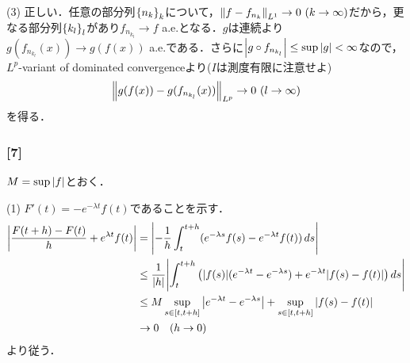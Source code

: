 \documentclass[a4j]{ltjsarticle}
\newcommand{\1}{\mathbbm{1}}
\numberwithin{equation}{section}
\theoremstyle{definition}
\begin{document}
(3) 正しい．任意の部分列$\qty{n_k}_k$について，$\norm{f-f_{n_k}}_{L^1}\to0\ (k\to\infty)$だから，更なる部分列$\qty{k_l}_l$があり$f_{n_{k_l}}\to f$ a.e.となる．$g$は連続より$g(f_{n_{k_l}}(x))\to g(f(x))$ a.e.である．さらに$\abs{g\circ f_{n_{k_l}}}\leq \sup\abs{g}<\infty$なので，$L^p$-variant of dominated convergenceより($I$は測度有限に注意せよ)
\begin{equation}
    \norm{g(f(x))-g(f_{n_{k_{l}}}(x))}_{L^p}\to0\ (l\to\infty)    
\end{equation}
を得る．
\subsubsection*{[7]}
$M=\sup\abs{f}$とおく．

(1) $F'(t)=-e^{-\lambda t}f(t)$であることを示す．
\begin{align}
    \abs{\frac{F(t+h)-F(t)}{h}+e^{\lambda t}f(t)}
    &=\abs{-\frac{1}{h}\int_{t}^{t+h}(e^{-\lambda s}f(s)-e^{-\lambda t}f(t))\,ds}\\
    &\leq \frac{1}{\abs{h}}\abs{\int_{t}^{t+h}\qty(\abs{f(s)}(e^{-\lambda t}-e^{-\lambda s})+e^{-\lambda t}\abs{f(s)-f(t)})\,ds}\\
    &\leq M\sup_{s\in[t,t+h]}\abs{e^{-\lambda t}-e^{-\lambda s}}+\sup_{s\in[t,t+h]}\abs{f(s)-f(t)}\\
    &\to0\quad (h\to0)
\end{align}
より従う．
\end{document}
